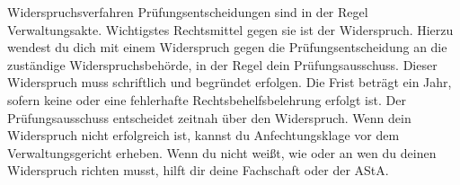\begin{artikel}{Widerspruchsverfahren}
Prüfungsentscheidungen sind in der Regel Verwaltungsakte. Wichtigstes Rechtsmittel gegen sie ist der Widerspruch. Hierzu wendest du dich mit einem Widerspruch gegen die Prüfungsentscheidung an die zuständige Widerspruchsbehörde, in der Regel dein Prüfungsausschuss. Dieser Widerspruch muss schriftlich und begründet erfolgen. Die Frist beträgt ein Jahr, sofern keine oder eine fehlerhafte Rechtsbehelfsbelehrung erfolgt ist. Der Prüfungsausschuss entscheidet zeitnah über den Widerspruch. Wenn dein Widerspruch nicht erfolgreich ist, kannst du Anfechtungsklage vor dem Verwaltungsgericht erheben. Wenn du nicht weißt, wie oder an wen du deinen Widerspruch richten musst, hilft dir deine Fachschaft oder der AStA.
\end{artikel}
